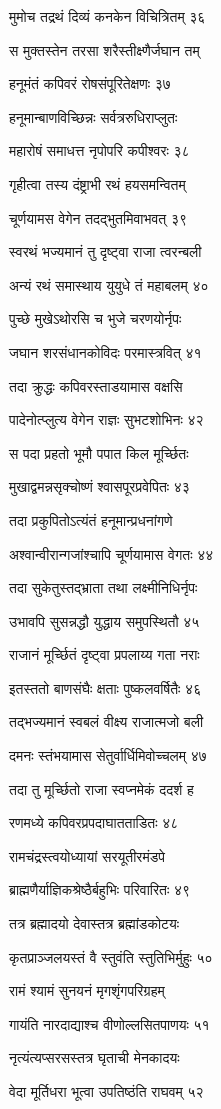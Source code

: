 मुमोच तद्रथं दिव्यं कनकेन विचित्रितम् ३६

स मुक्तस्तेन तरसा शरैस्तीक्ष्णैर्जघान तम्

हनूमंतं कपिवरं रोषसंपूरितेक्षणः ३७

हनूमान्बाणविच्छिन्नः सर्वत्ररुधिराप्लुतः

महारोषं समाधत्त नृपोपरि कपीश्वरः ३८

गृहीत्वा तस्य दंष्ट्राभी रथं हयसमन्वितम्

चूर्णयामस वेगेन तदद्भुतमिवाभवत् ३९

स्वरथं भज्यमानं तु दृष्ट्वा राजा त्वरन्बली

अन्यं रथं समास्थाय युयुधे तं महाबलम् ४०

पुच्छे मुखेऽथोरसि च भुजे चरणयोर्नृपः

जघान शरसंधानकोविदः परमास्त्रवित् ४१

तदा क्रुद्धः कपिवरस्ताडयामास वक्षसि

पादेनोत्प्लुत्य वेगेन राज्ञः सुभटशोभिनः ४२

स पदा प्रहतो भूमौ पपात किल मूर्च्छितः

मुखाद्वमन्नसृक्चोष्णं श्वासपूरप्रवेपितः ४३

तदा प्रकुपितोऽत्यंतं हनूमान्प्रधनांगणे

अश्वान्वीरान्गजांश्चापि चूर्णयामास वेगतः ४४

तदा सुकेतुस्तद्भ्राता तथा लक्ष्मीनिधिर्नृपः

उभावपि सुसन्नद्धौ युद्धाय समुपस्थितौ ४५

राजानं मूर्च्छितं दृष्ट्वा प्रपलाय्य गता नराः

इतस्ततो बाणसंघैः क्षताः पुष्कलवर्षितैः ४६

तद्भज्यमानं स्वबलं वीक्ष्य राजात्मजो बली

दमनः स्तंभयामास सेतुर्वार्धिमिवोच्चलम् ४७

तदा तु मूर्च्छितो राजा स्वप्नमेकं ददर्श ह

रणमध्ये कपिवरप्रपदाघातताडितः ४८

रामचंद्रस्त्वयोध्यायां सरयूतीरमंडपे

ब्राह्मणैर्याज्ञिकश्रेष्ठैर्बहुभिः परिवारितः ४९

तत्र ब्रह्मादयो देवास्तत्र ब्रह्मांडकोटयः

कृतप्राञ्जलयस्तं वै स्तुवंति स्तुतिभिर्मुहुः ५०

रामं श्यामं सुनयनं मृगशृंगपरिग्रहम्

गायंति नारदाद्याश्च वीणोल्लसितपाणयः ५१

नृत्यंत्यप्सरसस्तत्र घृताची मेनकादयः

वेदा मूर्तिधरा भूत्वा उपतिष्ठंति राघवम् ५२

